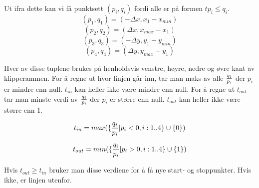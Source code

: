 Ut ifra dette kan vi få punktsett $(p_i,q_i)$ fordi alle er på formen $t p_i \le q_i$.
\begin{equation}
    (p_1, q_1) = (-\Delta x, x_1 - x_{min})
\end{equation}
\begin{equation}
    (p_2, q_2) = (\Delta x, x_{max} - x_1)
\end{equation}
\begin{equation}
    (p_3, q_3) = (-\Delta y, y_1 - y_{min})
\end{equation}
\begin{equation}
    (p_4, q_4) = (\Delta y, y_{max} - y_1)
\end{equation}

Hver av disse tuplene brukes på henholdsvis venstre, høyre, nedre og øvre kant av klipperammen. For å regne ut hvor linjen går inn, tar man maks av alle ${q_i \over p_i}$ der $p_i$ er mindre enn null. $t_{in}$ kan heller ikke være mindre enn null. For å regne ut $t_{out}$ tar man minste verdi av ${q_i \over p_i}$ der $p_i$ er større enn null. $t_{out}$ kan heller ikke være større enn 1.

\begin{equation}
    t_{in} = max(\{{q_i \over p_i} | p_i < 0, i:1..4\} \cup \{0\})
\end{equation}

\begin{equation}
    t_{out} = min(\{{q_i \over p_i} | p_i > 0, i:1..4\} \cup \{1\})
\end{equation}

Hvis $t_{out} \ge t_{in}$ bruker man disse verdiene for å få nye start- og stoppunkter. Hvis ikke, er linjen utenfor.


